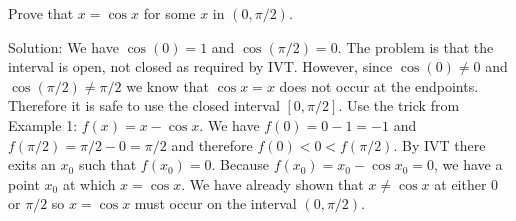 
Prove that $x=\cos x$ for some $x$ in $(0,\pi/2)$.

\medskip

Solution: We have $\cos(0)=1$ and $\cos(\pi/2)=0$.
The problem is that the interval is open, not closed as required by IVT.
However, since $\cos(0)\ne0$ and $\cos(\pi/2)\ne\pi/2$ we know that
$\cos x=x$ does not occur at the endpoints.
Therefore it is safe to use the closed interval $[0,\pi/2]$.
Use the trick from Example 1: $f(x)=x-\cos x$.
We have $f(0)=0-1=-1$ and $f(\pi/2)=\pi/2-0=\pi/2$ and
therefore $f(0)<0<f(\pi/2)$.
By IVT there exits an $x_0$ such that $f(x_0)=0$.
Because $f(x_0)=x_0-\cos x_0=0$, we have a point $x_0$
at which $x=\cos x$.
We have already shown that $x\ne\cos x$ at either $0$ or $\pi/2$ so
$x=\cos x$ must occur on the interval $(0,\pi/2)$.

